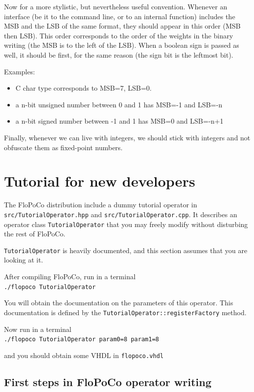 \documentclass{article}
\begin{document}
Now for a more stylistic, but nevertheless useful convention. Whenever an interface (be it to the command line, or to an internal function) includes the MSB and the LSB of the same format, they should appear in this order (MSB then LSB). This order corresponds to the order of the weights in the binary writing (the MSB is to the left of the LSB). 
When a boolean sign is passed as well, it should be first, for the same reason (the sign bit is the leftmost bit).

Examples:
\begin{itemize}
\item C char type corresponds to MSB=7, LSB=0.
\item a n-bit unsigned number between 0 and 1 has MSB=-1 and LSB=-n
\item a n-bit signed number between -1 and 1 has MSB=0 and LSB=-n+1
\end{itemize}

Finally, whenever we can live with integers, we should stick with integers and not obfuscate them as fixed-point numbers.




\section{Tutorial for new developers \label{sec:tutorial}}

The FloPoCo distribution include a dummy tutorial operator in \texttt{src/TutorialOperator.hpp} and \texttt{src/TutorialOperator.cpp}.
It describes an operator class \texttt{TutorialOperator} that you may freely modify without disturbing the rest of FloPoCo.

\texttt{TutorialOperator} is heavily documented, and this section assumes that you are looking at it.

After compiling FloPoCo, run in a terminal\\
\verb!./flopoco TutorialOperator!

You will obtain the documentation on the parameters of this operator.
This documentation is defined by the \texttt{TutorialOperator::registerFactory} method.

Now run in a terminal\\
\verb!./flopoco TutorialOperator param0=8 param1=8!

and you should obtain  some VHDL in \texttt{flopoco.vhdl}


\subsection{First steps in FloPoCo operator writing}
\end{document}
